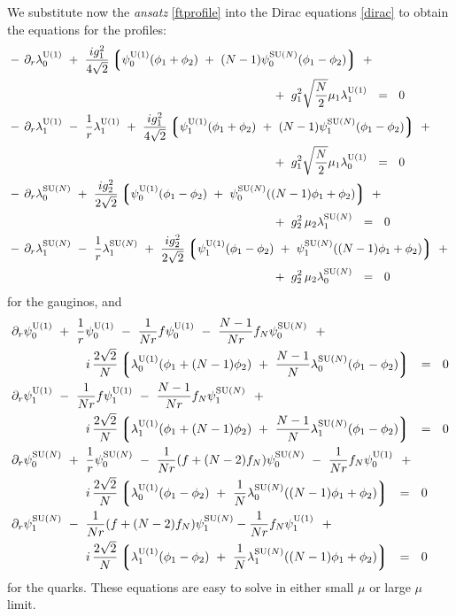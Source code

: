 \documentclass[12pt]{article}
\newcommand{\p}{\partial}
\newcommand{\lgr}{\left\lgroup}
\newcommand{\rgr}{\right\rgroup}
\newcommand{\loU}{\lambda_0^{\rm U(1)}}
\newcommand{\llU}{\lambda_1^{\rm U(1)}}
\newcommand{\loN}{\lambda_0^\text{SU($N$)}}
\newcommand{\llN}{\lambda_1^\text{SU($N$)}}
\newcommand{\poU}{\psi_0^{\rm U(1)}}
\newcommand{\plU}{\psi_1^{\rm U(1)}}
\newcommand{\poN}{\psi_0^\text{SU($N$)}}
\newcommand{\plN}{\psi_1^\text{SU($N$)}}
\begin{document}
	We substitute now the {\it ansatz} \eqref{ftprofile} into the Dirac equations \eqref{dirac} to obtain the 
	equations for the profiles:
\begin{align}
%
\notag
&
	-\, \p_r \loU ~+~ \frac{i g_1^2}{4\sqrt{2}} 
			\lgr \poU (\phi_1 + \phi_2) ~+~ (N-1) \poN (\phi_1 - \phi_2) \rgr ~+~\\
\notag
	&\qquad\qquad\qquad\qquad\qquad\qquad\qquad\qquad\qquad\qquad\qquad
				~+~ g_1^2 \sqrt{\frac{N}{2}} \mu_1 \llU    ~~=~~ 0
	\\
%
\notag
&
	-\, \p_r \llU ~-~ \frac{1}{r}\llU 
	~+~ \frac{i g_1^2}{4\sqrt{2}} 
	    \lgr \plU (\phi_1 + \phi_2) ~+~ (N-1) \plN (\phi_1 - \phi_2) \rgr ~+~\\
\notag
	&\qquad\qquad\qquad\qquad\qquad\qquad\qquad\qquad\qquad\qquad\qquad
	~+~ g_1^2 \sqrt{\frac{N}{2}} \mu_1 \loU ~~=~~ 0
	\\
%
\label{lambdaeqs}
&
	-\, \p_r \loN ~+~ 
	\frac{i g_2^2}{2\sqrt{2}}
		\lgr \poU (\phi_1 - \phi_2) ~+~ \poN ( (N-1) \phi_1 + \phi_2 ) \rgr ~+~\\
\notag
	&\qquad\qquad\qquad\qquad\qquad\qquad\qquad\qquad\qquad\qquad\qquad
	~+~ g_2^2\, \mu_2 \llN ~~=~~ 0
	\\
%
\notag
&
	-\, \p_r \llN ~-~ \frac{1}{r}\llN
	~+~ \frac{i g_2^2}{2\sqrt{2}} 
		\lgr \plU (\phi_1 - \phi_2) ~+~ \plN ( (N-1) \phi_1 + \phi_2 ) \rgr ~+~\\
\notag
	&\qquad\qquad\qquad\qquad\qquad\qquad\qquad\qquad\qquad\qquad\qquad
	~+~ g_2^2\, \mu_2 \loN ~~=~~ 0
\end{align}
	for the gauginos, and 
\begin{align}
%
\notag
&
	\p_r \poU ~+~ \frac{1}{r} \poU ~-~ \frac{1}{Nr}f \poU ~-~ \frac{N-1}{Nr} f_N \poN 
	~~+~~  \\
&\notag
\qquad\qquad\qquad
	i\, \frac{2\sqrt{2}}{N} 
		\lgr  \loU (\phi_1 + (N-1)\phi_2) ~+~ \frac{N-1}{N} \loN (\phi_1 - \phi_2) \rgr 
		~~=~~ 0
	\\
%
&
\notag
	\p_r \plU ~-~ \frac{1}{Nr}f \plU ~-~ \frac{N-1}{Nr} f_N \plN 
	~~+~~ \\
&\notag
\qquad\qquad\qquad
	i\, \frac{2\sqrt{2}}{N}
		\lgr \llU (\phi_1 + (N-1) \phi_2) ~+~ \frac{N-1}{N} \llN (\phi_1 - \phi_2) \rgr
		~~=~~ 0
	\\
%
&
\label{psieqs}
	\p_r \poN ~+~ \frac{1}{r} \poN ~-~ \frac{1}{Nr} (f + (N-2)f_N) \poN ~-~
			\frac{1}{Nr} f_N \poU 
	~~+~~ \\
&\notag
\qquad\qquad\qquad
	i\, \frac{2\sqrt{2}}{N} 
		\lgr \loU (\phi_1 - \phi_2) ~+~ \frac{1}{N} \loN ((N-1)\phi_1 + \phi_2) \rgr
		~~=~~ 0
	\\
%
&
\notag
	\p_r \plN ~-~ \frac{1}{Nr} (f + (N-2)f_N) \plN - \frac{1}{Nr} f_N \plU 
	~~+~~  \\
&\notag
\qquad\qquad\qquad
	i\, \frac{2\sqrt{2}}{N}
		\lgr \llU (\phi_1 - \phi_2) ~+~ \frac{1}{N} \llN ((N-1)\phi_1 + \phi_2) \rgr
		~~=~~ 0~
\end{align}
	for the quarks.
	These equations are easy to solve in either small $ \mu $ or large $ \mu $ limit.
\end{document}
